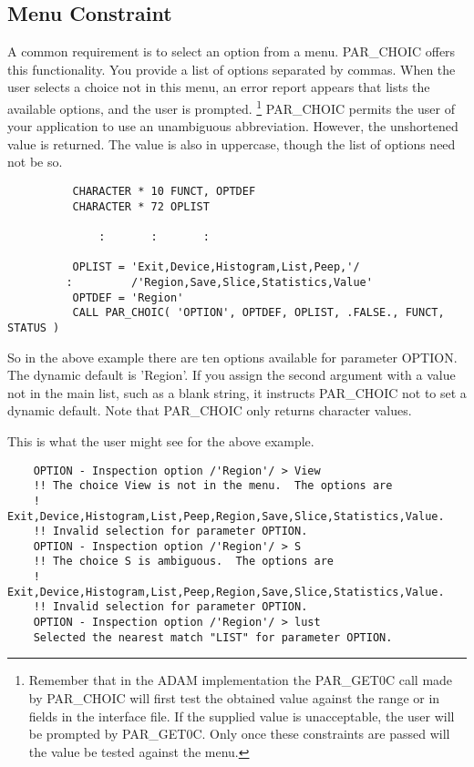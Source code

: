 \documentclass[twoside,11pt]{article}
\newcommand{\xlabel}[1]{}
\begin{document}
\subsection{\xlabel{menu_constraint}Menu Constraint}

A common requirement is to select an option from a menu.  PAR\_CHOIC
offers this functionality.   You provide a list of options separated by
commas.  When the user selects a choice not in this menu, an error
report appears that lists the available options, and the user is
prompted. \footnote{Remember that in the ADAM implementation the PAR\_GET0C
call made by PAR\_CHOIC will first test the obtained value against the
range or in fields in the interface file.  If the supplied value is
unacceptable, the user will be prompted by PAR\_GET0C.  Only once these
constraints are passed will the value be tested against the menu.}  
PAR\_CHOIC permits the user of your application to use an unambiguous
abbreviation.  However, the unshortened value is returned.  The value is
also in uppercase, though the list of options need not be so. 

\begin{verbatim}
          CHARACTER * 10 FUNCT, OPTDEF
          CHARACTER * 72 OPLIST

              :       :       :

          OPLIST = 'Exit,Device,Histogram,List,Peep,'/
         :         /'Region,Save,Slice,Statistics,Value'
          OPTDEF = 'Region'
          CALL PAR_CHOIC( 'OPTION', OPTDEF, OPLIST, .FALSE., FUNCT, STATUS )
\end{verbatim}

So in the above example there are ten options available for parameter
OPTION.  The dynamic default is 'Region'.  If you assign the second
argument with a value not in the main list, such as a blank string, it
instructs PAR\_CHOIC not to set a dynamic default. Note that
PAR\_CHOIC only returns character values. 

This is what the user might see for the above example.
\begin{verbatim}
    OPTION - Inspection option /'Region'/ > View
    !! The choice View is not in the menu.  The options are
    !     Exit,Device,Histogram,List,Peep,Region,Save,Slice,Statistics,Value.
    !! Invalid selection for parameter OPTION.
    OPTION - Inspection option /'Region'/ > S
    !! The choice S is ambiguous.  The options are
    !     Exit,Device,Histogram,List,Peep,Region,Save,Slice,Statistics,Value.
    !! Invalid selection for parameter OPTION.
    OPTION - Inspection option /'Region'/ > lust
    Selected the nearest match "LIST" for parameter OPTION.
\end{verbatim}
\end{document}
